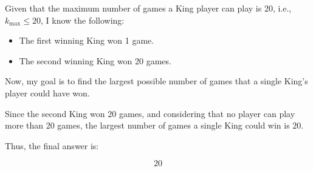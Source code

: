 Given that the maximum number of games a King player can play is 20, i.e., \( k_{\text{max}} \leq 20 \), I know the following:

\begin{itemize}
    \item The first winning King won 1 game.
    \item The second winning King won 20 games.
\end{itemize}

Now, my goal is to find the largest possible number of games that a single King's player could have won.

Since the second King won 20 games, and considering that no player can play more than 20 games, the largest number of games a single King could win is \( 20 \).

Thus, the final answer is:

\[
\boxed{20}
\]
